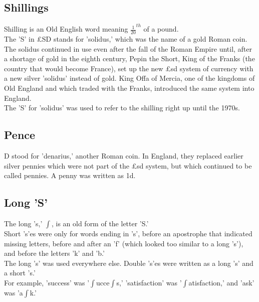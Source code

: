 \documentclass{article}
\begin{document}
\newpage

\subsection*{Shillings}
Shilling is an Old English word meaning $\frac{1}{20}^{th}$ of a pound.\\

The 'S' in £SD stands for 'solidus,' which was the name of a gold Roman coin. The solidus continued in use even after the fall of the Roman Empire until, after a shortage of gold in the eighth century, Pepin the Short, King of the Franks (the country that would become France), set up the new £sd system of currency with a new silver 'solidus' instead of gold. King Offa of Mercia, one of the kingdoms of Old England and which traded with the Franks, introduced the same system into England.\\

The 'S' for 'solidus' was used to refer to the shilling right up until the 1970s.\\

\subsection*{Pence}
D stood for 'denarius,' another Roman coin. In England, they replaced earlier silver pennies which were not part of the £sd system, but which continued to be called pennies. A penny was written as 1d.

\newpage

\subsection*{Long 'S'}

The long 's,' $\int$, is an old form of the letter 'S.'\\

Short 's'es were only for words ending in 's', before an apostrophe that indicated missing letters, before and after an 'f' (which looked too similar to a long 's'), and before the letters 'k' and 'b.'\\

The long 's' was used everywhere else. Double 's'es were written as a long 's' and a short 's.'\\

For example, 'success' was '$\int$ucce$\int$s,' 'satisfaction' was '$\int$atisfaction,' and 'ask' was 'a$\int$k.'\\
\end{document}

